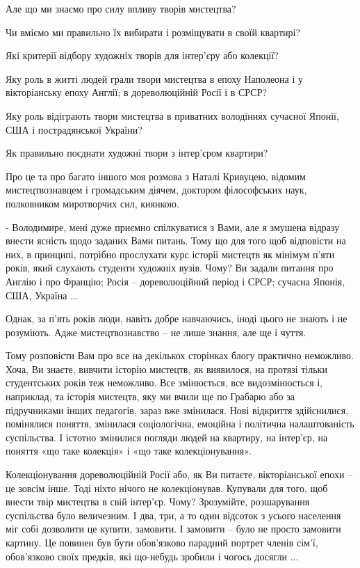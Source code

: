 Але що ми знаємо про силу впливу творів мистецтва? 

Чи вміємо ми правильно їх вибирати і розміщувати в своїй квартирі? 

Які критерії відбору художніх творів для інтер'єру або колекції? 

Яку роль в житті людей грали твори мистецтва в епоху Наполеона і у
вікторіанську епоху Англії; в дореволюційній Росії і в СРСР? 

Яку роль відіграють твори мистецтва в приватних володіннях сучасної Японії, США
і пострадянської України? 


Як правильно поєднати художні твори з інтер'єром квартири?

Про це та про багато іншого моя розмова з Наталі Кривуцею, відомим
мистецтвознавцем і громадським діячем, доктором філософських наук, полковником
миротворчих сил, киянкою.

- Володимире, мені дуже приємно спілкуватися з Вами, але я змушена відразу
внести ясність щодо заданих Вами питань. Тому що для того щоб відповісти на
них, в принципі, потрібно прослухати курс історії мистецтв як мінімум п'яти
років, який слухають студенти художніх вузів. Чому? Ви задали питання про
Англію і про Францію; Росія – дореволюційний період і СРСР; сучасна Японія,
США, Україна ... 

Однак, за п'ять років люди, навіть добре навчаючись, іноді
цього не знають і не розуміють. Адже мистецтвознавство – не лише знання, але ще
і чуття. 


Тому розповісти Вам про все на декількох сторінках блогу практично
неможливо. Хоча, Ви знаєте, вивчити історію мистецтв, як виявилося, на протязі
тільки студентських років теж неможливо. Все змінюється, все видозмінюється і,
наприклад, та історія мистецтв, яку ми вчили ще по Грабарю або за підручниками
інших педагогів, зараз вже змінилася. Нові відкриття здійснилися, помінялися
поняття, змінилася соціологічна, емоційна і політична налаштованість
суспільства. І істотно змінилися погляди людей на квартиру, на інтер'єр, на
поняття «що таке колекція» і «що таке колекціонування».

Колекціонування дореволюційній Росії або, як Ви питаєте, вікторіанської епохи –
це зовсім інше. Тоді ніхто нічого не колекціонував. Купували для того, щоб
внести твір мистецтва в свій інтер'єр. Чому? Зрозумійте, розшарування
суспільства було величезним. І два, три, а то один відсоток з усього населення
міг собі дозволити це купити, замовити. І замовити – було не просто замовити
картину. Це повинен був бути обов'язково парадний портрет членів сім'ї,
обов'язково своїх предків, які що-небудь зробили і чогось досягли ... 

